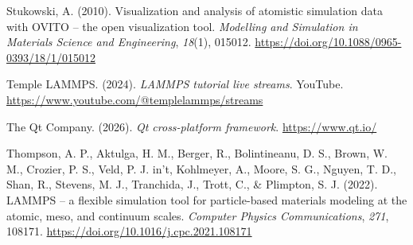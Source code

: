 \documentclass[
]{article}
\newlength{\cslhangindent}
\newenvironment{CSLReferences}[2] %
 {\begin{list}{}{%
  \setlength{\itemindent}{0pt}
  \setlength{\leftmargin}{0pt}
  \setlength{\parsep}{0pt}
  \ifodd #1
   \setlength{\leftmargin}{\cslhangindent}
   \setlength{\itemindent}{-1\cslhangindent}
  \fi
  \setlength{\itemsep}{#2\baselineskip}}}
 {\end{list}}
\begin{document}
\begin{CSLReferences}{1}{0}
Stukowski, A. (2010). Visualization and analysis of atomistic simulation
data with {OVITO} -- the open visualization tool. \emph{Modelling and
Simulation in Materials Science and Engineering}, \emph{18}(1), 015012.
\url{https://doi.org/10.1088/0965-0393/18/1/015012}

Temple LAMMPS. (2024). \emph{{LAMMPS} tutorial live streams}. YouTube.
\url{https://www.youtube.com/@templelammps/streams}

The Qt Company. (2026). \emph{Qt cross-platform framework}.
\url{https://www.qt.io/}

Thompson, A. P., Aktulga, H. M., Berger, R., Bolintineanu, D. S., Brown,
W. M., Crozier, P. S., Veld, P. J. in't, Kohlmeyer, A., Moore, S. G.,
Nguyen, T. D., Shan, R., Stevens, M. J., Tranchida, J., Trott, C., \&
Plimpton, S. J. (2022). {LAMMPS} -- a flexible simulation tool for
particle-based materials modeling at the atomic, meso, and continuum
scales. \emph{Computer Physics Communications}, \emph{271}, 108171.
\url{https://doi.org/10.1016/j.cpc.2021.108171}

\end{CSLReferences}
\end{document}
